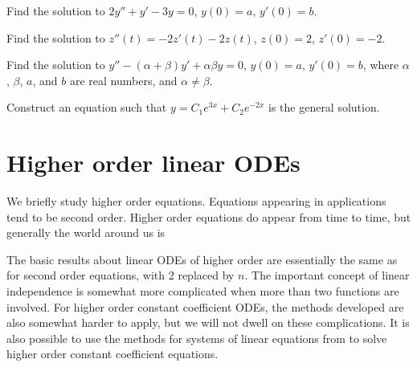 \documentclass[12pt]{book}
\begin{document}
\begin{exercise}
Find the solution to
$2y''+y'-3y=0$, $y(0) = a$, $y'(0)=b$.
\end{exercise}

\begin{exercise}
Find the solution to
$z''(t) = -2z'(t)-2z(t)$, $z(0) = 2$, $z'(0)= -2$.
\end{exercise}

\begin{exercise}
Find the solution to
$y''-(\alpha+\beta) y' + \alpha \beta y=0$, $y(0) = a$, $y'(0)=b$,
where $\alpha$, $\beta$, $a$, and $b$ are real numbers, and $\alpha \not=
\beta$.
\end{exercise}

\begin{exercise}
Construct an equation such that $y = C_1 e^{3x} + C_2 e^{-2x}$ is the general
solution.
\end{exercise}


\sectionnewpage
\section{Higher order linear ODEs} \label{sec:hol}


%

We briefly study higher order equations.
Equations appearing in applications tend to be second
order.  Higher order equations do appear from time to time, but
generally the world around us is   

The basic results about linear ODEs of higher order are essentially 
the same as for second order equations, with 2 replaced by $n$.
The important concept
of linear independence is somewhat more complicated when more than two
functions are involved.
For higher order constant coefficient ODEs, the methods developed are also
somewhat harder to apply,
but we will not dwell on these complications.
It is also possible to use the methods for systems
of linear equations from  to solve higher order
constant coefficient equations.
\end{document}
